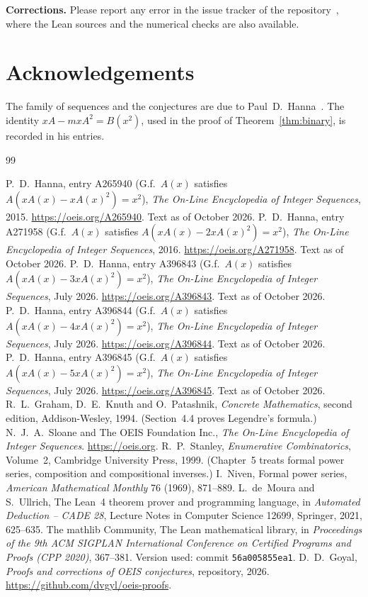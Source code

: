 \documentclass[11pt,a4paper]{article}
\theoremstyle{definition}
\theoremstyle{remark}
\newcommand{\para}[1]{\par\medskip\noindent\textbf{#1}\enspace}
\begin{document}
\para{Corrections.} Please report any error in the issue tracker of the repository~\cite{repo}, where the Lean sources and the numerical checks are also
available.

\section*{Acknowledgements}
The family of sequences and the conjectures are due to Paul~D.~Hanna~\cite{oeis1,oeis2,oeis3,oeis4,oeis5}. The identity
$xA-mxA^2=B(x^2)$, used in the proof of Theorem~\ref{thm:binary}, is recorded in his entries. 

\begin{thebibliography}{99}\small
\raggedright
{} P.~D.~Hanna, entry A265940 (G.f.\ $A(x)$ satisfies $A(xA(x)-xA(x)^2)=x^2$), \emph{The On-Line Encyclopedia of Integer Sequences}, 2015. \url{https://oeis.org/A265940}. Text as of October 2026.
 P.~D.~Hanna, entry A271958 (G.f.\ $A(x)$ satisfies $A(xA(x)-2xA(x)^2)=x^2$), \emph{The On-Line Encyclopedia of Integer Sequences}, 2016. \url{https://oeis.org/A271958}. Text as of October 2026.
 P.~D.~Hanna, entry A396843 (G.f.\ $A(x)$ satisfies $A(xA(x)-3xA(x)^2)=x^2$), \emph{The On-Line Encyclopedia of Integer Sequences}, July 2026. \url{https://oeis.org/A396843}. Text as of October 2026.
 P.~D.~Hanna, entry A396844 (G.f.\ $A(x)$ satisfies $A(xA(x)-4xA(x)^2)=x^2$), \emph{The On-Line Encyclopedia of Integer Sequences}, July 2026. \url{https://oeis.org/A396844}. Text as of October 2026.
 P.~D.~Hanna, entry A396845 (G.f.\ $A(x)$ satisfies $A(xA(x)-5xA(x)^2)=x^2$), \emph{The On-Line Encyclopedia of Integer Sequences}, July 2026. \url{https://oeis.org/A396845}. Text as of October 2026.
 R.~L.~Graham, D.~E.~Knuth and O.~Patashnik, \emph{Concrete Mathematics}, second edition, Addison-Wesley, 1994. (Section~4.4 proves Legendre's formula.)
 N.~J.~A.~Sloane and The OEIS Foundation Inc., \emph{The On-Line Encyclopedia of Integer Sequences}. \url{https://oeis.org}.
 R.~P.~Stanley, \emph{Enumerative Combinatorics}, Volume~2, Cambridge University Press, 1999. (Chapter~5 treats formal power series, composition and compositional inverses.)
 I.~Niven, Formal power series, \emph{American Mathematical Monthly} 76 (1969), 871--889.
 L.~de~Moura and S.~Ullrich, The Lean~4 theorem prover and programming language, in \emph{Automated Deduction -- CADE 28}, Lecture Notes in Computer Science 12699, Springer, 2021, 625--635.
 The mathlib Community, The Lean mathematical library, in \emph{Proceedings of the 9th ACM SIGPLAN International Conference on Certified Programs and Proofs (CPP 2020)}, 367--381. Version used: commit \texttt{56a005855ea1}.
 D.~D.~Goyal, \emph{Proofs and corrections of OEIS conjectures}, repository, 2026. \url{https://github.com/dvgyl/oeis-proofs}.
\end{thebibliography}
\end{document}
